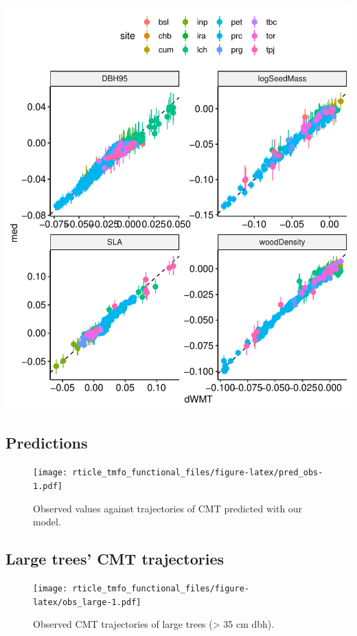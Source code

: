 \documentclass[]{elsarticle} %
\makeatletter
\def\maxwidth{\ifdim\Gin@nat@width>\linewidth\linewidth
\else\Gin@nat@width\fi}
\let\Oldincludegraphics\includegraphics
\renewcommand{\includegraphics}[1]{\Oldincludegraphics[width=\maxwidth]{#1}}
\makeatother
\begin{document}
\includegraphics{rticle_tmfo_functional_files/figure-latex/gof-1.pdf}

\subsection{Predictions}\label{predictions-1}

\begin{figure}
\centering
\texttt{[image: rticle\_tmfo\_functional\_files/figure-latex/pred\_obs-1.pdf]}
\caption{\label{sfig:pred_traj} Observed values against trajectories of
CMT predicted with our model.}
\end{figure}

\subsection{Large trees' CMT
trajectories}\label{large-trees-cmt-trajectories}

\begin{figure}
\centering
\texttt{[image: rticle\_tmfo\_functional\_files/figure-latex/obs\_large-1.pdf]}
\caption{\label{sfig:pred_traj} Observed CMT trajectories of large trees
(\textgreater{} 35 cm dbh).}
\end{figure}
\end{document}
